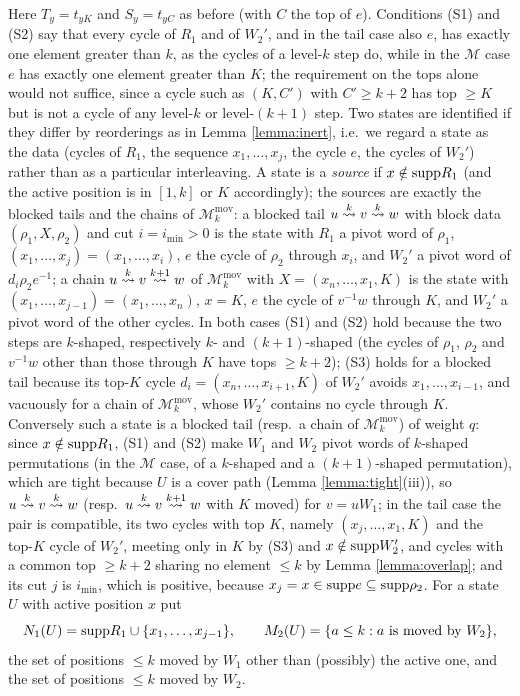 \documentclass{amsart}
\theoremstyle{definition}
\theoremstyle{remark}
\numberwithin{equation}{section}
\newcommand{\xrightsquigarrow}[2][]{%
	\mathrel{\mathop{\rightsquigarrow}\limits^{\scriptstyle #2}%
	\ifx\hfuzz#1\hfuzz\else_{\scriptstyle #1}\fi}%
}
\newcommand{\tom}[1]{\ensuremath{\xrightsquigarrow{#1}}}
\begin{document}
Here $T_y=t_{yK}$ and $S_y=t_{yC}$ as before (with $C$ the top of $e$). Conditions (S1) and (S2) say that every cycle of $R_1$ and of $W_2'$, and in the tail case also $e$, has exactly one element greater than $k$, as the cycles of a level-$k$ step do, while in the $\mathcal M$ case $e$ has exactly one element greater than $K$; the requirement on the tops alone would not suffice, since a cycle such as $(K,C')$ with $C'\geq k+2$ has top $\geq K$ but is not a cycle of any level-$k$ or level-$(k+1)$ step. Two states are identified if they differ by reorderings as in Lemma \ref{lemma:inert}, i.e.\ we regard a state as the data (cycles of $R_1$, the sequence $x_1,\ldots,x_j$, the cycle $e$, the cycles of $W_2'$) rather than as a particular interleaving. A state is a \emph{source} if $x\notin\mathrm{supp} R_1$ (and the active position is in $[1,k]$ or $K$ accordingly); the sources are exactly the blocked tails and the chains of $\mathcal M_k^{\mathrm{mov}}$: a blocked tail $u\tom{k}v\tom{k}w$ with block data $(\rho_1,X,\rho_2)$ and cut $i=i_{\min}>0$ is the state with $R_1$ a pivot word of $\rho_1$, $(x_1,\ldots,x_j)=(x_1,\ldots,x_i)$, $e$ the cycle of $\rho_2$ through $x_i$, and $W_2'$ a pivot word of $d_i\rho_2e^{-1}$; a chain $u\tom{k}v\tom{k+1}w$ of $\mathcal M_k^{\mathrm{mov}}$ with $X=(x_n,\ldots,x_1,K)$ is the state with $(x_1,\ldots,x_{j-1})=(x_1,\ldots,x_n)$, $x=K$, $e$ the cycle of $v^{-1}w$ through $K$, and $W_2'$ a pivot word of the other cycles. In both cases (S1) and (S2) hold because the two steps are $k$-shaped, respectively $k$- and $(k+1)$-shaped (the cycles of $\rho_1$, $\rho_2$ and $v^{-1}w$ other than those through $K$ have tops $\geq k+2$); (S3) holds for a blocked tail because its top-$K$ cycle $d_i=(x_n,\ldots,x_{i+1},K)$ of $W_2'$ avoids $x_1,\ldots,x_{i-1}$, and vacuously for a chain of $\mathcal M_k^{\mathrm{mov}}$, whose $W_2'$ contains no cycle through $K$. Conversely such a state is a blocked tail (resp.\ a chain of $\mathcal M_k^{\mathrm{mov}}$) of weight $q$: since $x\notin\mathrm{supp} R_1$, (S1) and (S2) make $W_1$ and $W_2$ pivot words of $k$-shaped permutations (in the $\mathcal M$ case, of a $k$-shaped and a $(k+1)$-shaped permutation), which are tight because $U$ is a cover path (Lemma \ref{lemma:tight}(iii)), so $u\tom{k}v\tom{k}w$ (resp.\ $u\tom{k}v\tom{k+1}w$ with $K$ moved) for $v=uW_1$; in the tail case the pair is compatible, its two cycles with top $K$, namely $(x_j,\ldots,x_1,K)$ and the top-$K$ cycle of $W_2'$, meeting only in $K$ by (S3) and $x\notin\mathrm{supp} W_2'$, and cycles with a common top $\geq k+2$ sharing no element $\leq k$ by Lemma \ref{lemma:overlap}; and its cut $j$ is $i_{\min}$, which is positive, because $x_j=x\in\mathrm{supp} e\subseteq\mathrm{supp}\rho_2$. For a state $U$ with active position $x$ put
$$N_1(U)=\mathrm{supp} R_1\cup\{x_1,\ldots,x_{j-1}\},\qquad M_2(U)=\{a\leq k: a\text{ is moved by }W_2\},$$
the set of positions $\leq k$ moved by $W_1$ other than (possibly) the active one, and the set of positions $\leq k$ moved by $W_2$.
\end{document}
